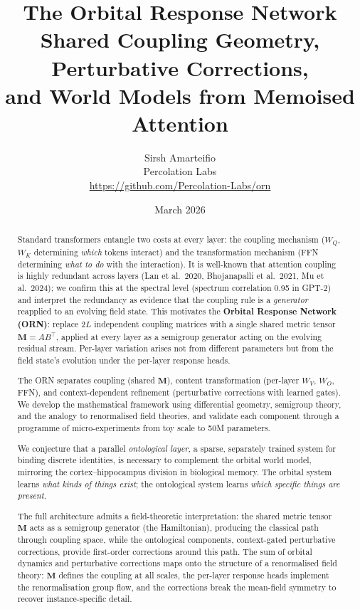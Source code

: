 \documentclass[11pt, a4paper]{article}
\title{%
    \textbf{The Orbital Response Network}\\[4pt]
    \Large Shared Coupling Geometry, Perturbative Corrections,\\
    and World Models from Memoised Attention%
}
\author{%
    Sirsh Amarteifio\\
    {\small Percolation Labs}\\
    {\small \url{https://github.com/Percolation-Labs/orn}}%
}
\date{March 2026 \quad{\small\textnormal{,  Theory Document}}}
\newcommand{\M}{\mathbf{M}}
\theoremstyle{remark}
\begin{document}
\maketitle

\begin{abstract}
Standard transformers entangle two costs at every layer: the coupling mechanism ($W_Q$, $W_K$ determining \emph{which} tokens interact) and the transformation mechanism (FFN determining \emph{what to do} with the interaction).
It is well-known that attention coupling is highly redundant across layers (Lan et al.\ 2020, Bhojanapalli et al.\ 2021, Mu et al.\ 2024); we confirm this at the spectral level (spectrum correlation 0.95 in GPT-2) and interpret the redundancy as evidence that the coupling rule is a \emph{generator} reapplied to an evolving field state.
This motivates the \textbf{Orbital Response Network (ORN)}: replace $2L$ independent coupling matrices with a single shared metric tensor $\M = AB^\top$, applied at every layer as a semigroup generator acting on the evolving residual stream.
Per-layer variation arises not from different parameters but from the field state's evolution under the per-layer response heads.

The ORN separates coupling (shared $\M$), content transformation (per-layer $W_V$, $W_O$, FFN), and context-dependent refinement (perturbative corrections with learned gates).
We develop the mathematical framework using differential geometry, semigroup theory, and the analogy to renormalised field theories, and validate each component through a programme of micro-experiments from toy scale to 50M parameters.

We conjecture that a parallel \emph{ontological layer}, a sparse, separately trained system for binding discrete identities, is necessary to complement the orbital world model, mirroring the cortex--hippocampus division in biological memory.
The orbital system learns \emph{what kinds of things exist}; the ontological system learns \emph{which specific things are present}.

The full architecture admits a field-theoretic interpretation: the shared metric tensor $\M$ acts as a semigroup generator (the Hamiltonian), producing the classical path through coupling space, while the ontological components, context-gated perturbative corrections, provide first-order corrections around this path.
The sum of orbital dynamics and perturbative corrections maps onto the structure of a renormalised field theory: $\M$ defines the coupling at all scales, the per-layer response heads implement the renormalisation group flow, and the corrections break the mean-field symmetry to recover instance-specific detail.
\end{abstract}
\end{document}
